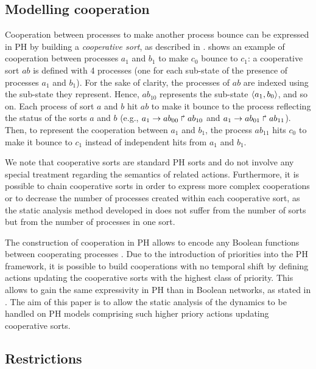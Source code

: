 


\subsection{Modelling cooperation}
\label{ssec:cooperation}

Cooperation between processes to make another process bounce can be expressed in PH by building a \emph{cooperative sort}, as described in \cite{PMR10-TCSB}.
 shows an example of cooperation between processes $a_1$ and $b_1$ to make $c_0$ bounce to $c_1$:
a cooperative sort $ab$ is defined with 4 processes (one for each sub-state of the presence of processes $a_1$ and $b_1$).
For the sake of clarity, the processes of $ab$ are indexed using the sub-state they represent.
Hence, $ab_{10}$ represents the sub-state $\mbox{$\langle a_1,b_0 \rangle$}$, and so on.
Each process of sort $a$ and $b$ hit $ab$ to make it bounce to the process reflecting the status of the sorts $a$ and $b$
(e.g., $a_1\rightarrow ab_{00}\Rsh ab_{10}$ and $a_1\rightarrow ab_{01}\Rsh ab_{11}$).
Then, to represent the cooperation between $a_1$ and $b_1$, the process $ab_{11}$ hits $c_0$ to make it bounce to $c_1$ instead of independent hits from $a_1$ and $b_1$.

We note that cooperative sorts are standard PH sorts and do not involve any
special treatment regarding the semantics of related actions.
Furthermore, it is possible to chain cooperative sorts in order to express more complex cooperations or
to decrease the number of processes created within each cooperative sort,
as the static analysis method developed in  does not suffer from the number of sorts but from the number of processes in one sort.

The construction of cooperation in PH allows to encode any Boolean functions between cooperating processes \cite{PMR10-TCSB}.
Due to the introduction of priorities into the PH framework,
it is possible to build cooperations with no temporal shift by defining actions updating the cooperative sorts with the highest class of priority.
This allows to gain the same expressivity in PH than in Boolean networks, as stated in .
The aim of this paper is to allow the static analysis of the dynamics to be handled on PH models comprising such higher priory actions updating cooperative sorts.



\label{ssec:hypothesis}
\subsection{Restrictions}

